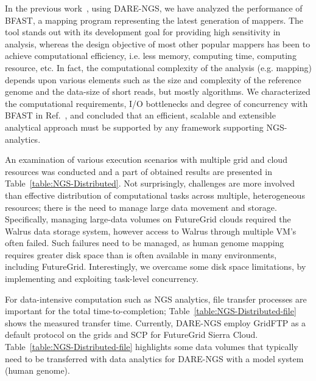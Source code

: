 \documentclass[]{svjour3}
\begin{document}
In the previous work~\cite{dare-ecmls11}, using DARE-NGS, we have analyzed the performance of BFAST, a mapping program representing the latest generation of mappers.  The tool stands out with its development goal for providing high sensitivity in analysis, whereas the design objective of most other popular mappers has been to achieve computational efficiency, i.e. less memory, computing time, computing resource, etc.  In fact, the computational complexity of the analysis (e.g. mapping) depends upon various elements such as the size and complexity of the reference genome and the data-size of short reads, but mostly algorithms.  We characterized the computational requirements, I/O bottlenecks and degree of concurrency with BFAST in Ref.~\cite{dare-ecmls11}, and concluded that an efficient, scalable and extensible analytical approach must be supported by any framework supporting NGS-analytics.

An examination of various execution scenarios with multiple
grid and cloud resources was conducted and a part of obtained results are presented in Table~\ref{table:NGS-Distributed}.  Not surprisingly, challenges are more involved than effective distribution of computational tasks across multiple, heterogeneous
resources; there is the need to manage large data movement and
storage.  Specifically, managing large-data volumes on FutureGrid
clouds required the Walrus data storage system\cite{walrusurl}, however access to Walrus through
multiple VM's often failed.  Such failures need to be managed, as
human genome mapping requires greater disk space than is often
available in many environments, including FutureGrid. Interestingly,
we overcame some disk space limitations, by implementing and
exploiting task-level concurrency.


For data-intensive computation such as NGS analytics, file transfer
processes are important for the total time-to-completion;
Table~\ref{table:NGS-Distributed-file} shows the measured transfer
time. Currently, DARE-NGS employ GridFTP as a default protocol on the
grids and SCP for FutureGrid Sierra Cloud.
Table~\ref{table:NGS-Distributed-file} highlights some data volumes
that typically need to be transferred with data analytics for DARE-NGS
with a model system (human genome).
\end{document}

